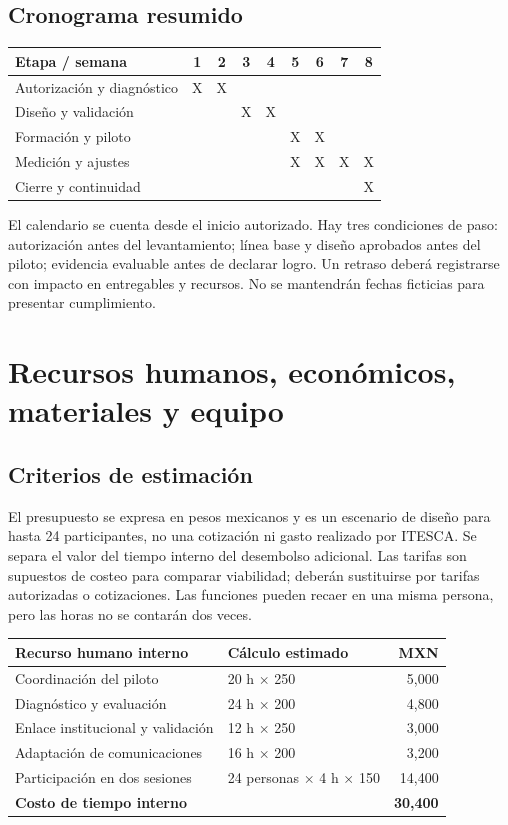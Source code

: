 \documentclass[12pt,letterpaper,oneside]{article}
\begin{document}
\subsection{Cronograma resumido}
\begin{center}
\begin{tabularx}{\linewidth}{@{}Ycccccccc@{}}
\toprule \textbf{Etapa / semana} & 1&2&3&4&5&6&7&8\\\midrule
Autorización y diagnóstico & X&X&&&&&&\\
Diseño y validación &&&X&X&&&&\\
Formación y piloto &&&&&X&X&&\\
Medición y ajustes &&&&&X&X&X&X\\
Cierre y continuidad &&&&&&&&X\\\bottomrule
\end{tabularx}
\end{center}
El calendario se cuenta desde el inicio autorizado. Hay tres condiciones de paso: autorización antes del levantamiento; línea base y diseño aprobados antes del piloto; evidencia evaluable antes de declarar logro. Un retraso deberá registrarse con impacto en entregables y recursos. No se mantendrán fechas ficticias para presentar cumplimiento.

\section{Recursos humanos, económicos, materiales y equipo}
\subsection{Criterios de estimación}
El presupuesto se expresa en pesos mexicanos y es un escenario de diseño para hasta 24 participantes, no una cotización ni gasto realizado por ITESCA. Se separa el valor del tiempo interno del desembolso adicional. Las tarifas son supuestos de costeo para comparar viabilidad; deberán sustituirse por tarifas autorizadas o cotizaciones. Las funciones pueden recaer en una misma persona, pero las horas no se contarán dos veces.

\begin{longtable}{@{}L{.43\textwidth}L{.30\textwidth}r@{}}
\toprule \textbf{Recurso humano interno} & \textbf{Cálculo estimado} & \textbf{MXN} \\
\midrule\endhead
Coordinación del piloto & 20 h $\times$ 250 & 5,000 \\
Diagnóstico y evaluación & 24 h $\times$ 200 & 4,800 \\
Enlace institucional y validación & 12 h $\times$ 250 & 3,000 \\
Adaptación de comunicaciones & 16 h $\times$ 200 & 3,200 \\
Participación en dos sesiones & 24 personas $\times$ 4 h $\times$ 150 & 14,400 \\
\midrule \textbf{Costo de tiempo interno} & & \textbf{30,400} \\
\bottomrule
\end{longtable}
\end{document}
